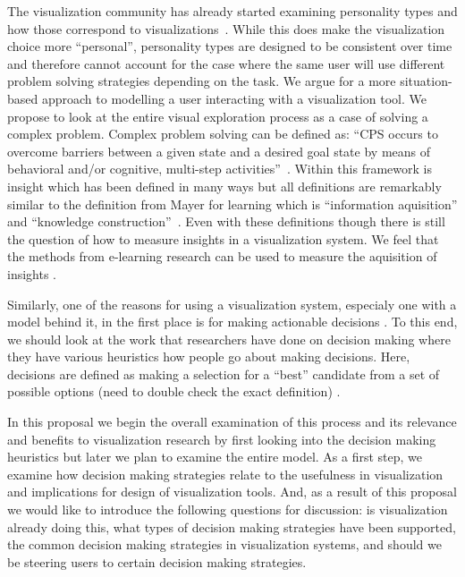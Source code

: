 The visualization community has already started examining personality types and
how those correspond to visualizations~. While this does make the visualization
choice more ``personal'', personality types are designed to be
consistent over time and therefore cannot account for the case where the same
user will use different problem solving strategies depending on the
task. We argue for a more situation-based approach to modelling a
user interacting with a visualization tool. We propose to look at the entire
visual exploration process as a case of solving a complex problem. Complex
problem solving can be defined as: ``CPS occurs to overcome barriers between a
given state and a desired goal state by means of behavioral and/or cognitive,
multi-step activities''~\citep{Frensch:2005}. Within this framework is insight
which has been defined in many ways but all definitions are remarkably similar
to the definition from Mayer for learning which is ``information aquisition''
and ``knowledge construction''~. Even with these definitions though
there is still the question of how to measure insights in a visualization
system. We feel that the methods from e-learning research can be used to
measure the aquisition of insights .

Similarly, one of the reasons for using a visualization system, especialy one
with a model behind it, in the first place is for making actionable decisions
. To this end, we should look at the work that
researchers have done on decision making where they have various heuristics how
people go about making decisions. Here, decisions are defined as making a
selection for a ``best'' candidate from a set of possible options (need to
double check the exact definition) .

In this proposal we begin the overall examination of this process and its
relevance and benefits to visualization research by first looking into the
decision making heuristics but later we plan to examine the entire model.  As a
first step, we examine how decision making strategies relate to the usefulness
in visualization and implications for design of visualization
tools.  And, as a result of this proposal we would like to introduce the
following questions for discussion: is visualization already doing this, what
types of decision making strategies have been supported, the common decision
making strategies in visualization systems, and should we be steering users to
certain decision making strategies.

